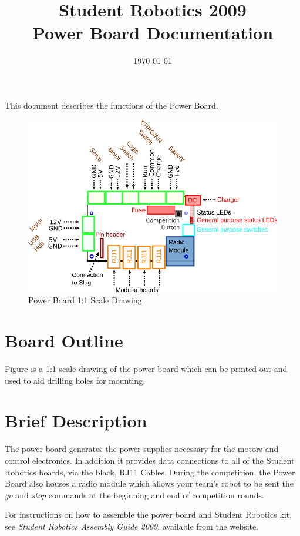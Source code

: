 \documentclass[a4paper, 12pt]{article}
\title {Student Robotics 2009\\ Power Board Documentation}
\date{\today}
\begin{document}
\maketitle

\noindent This document describes the functions of the Power Board. 

\begin{figure}
\centering
\includegraphics[scale=1, angle=90]{outline}
\caption{Power Board 1:1 Scale Drawing}
\label{fig:outline}
\end{figure}


\section{Board Outline}
Figure \label{fig:outline} is a 1:1 scale drawing of the power board which can be printed out and used to aid drilling holes for mounting.
\label{sec:outline}

\section{Brief Description}
The power board generates the power supplies necessary for the motors and control electronics. In addition it provides data connections to all of the Student Robotics boards, via the black, RJ11 Cables. During the competition, the Power Board also houses a radio module which allows your team's robot to be sent the \textit{go} and \textit{stop} commands at the beginning and end of competition rounds.

For instructions on how to assemble the power board and Student Robotics kit, see \textit{Student Robotics Assembly Guide 2009}, available from the website.
\end{document}
